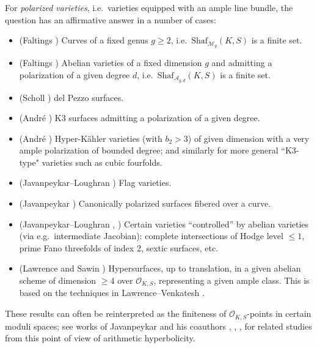\documentclass[11pt,reqno,oneside]{amsart}
\numberwithin{equation}{section}
\theoremstyle{definition}
\newcommand{\Sha}{\mathrm{Shaf}}
\begin{document}
For {\it polarized varieties}, i.e.~varieties equipped with an ample line bundle, the question has an affirmative answer in a number of cases:
\begin{itemize}
	\item (Faltings \cite{Faltings83}) Curves of a fixed genus $g\geq 2$, i.e.~$\Sha_{\mathcal{M}_g}(K,S)$ is a finite set. 
	\item (Faltings \cite{Faltings83}) Abelian varieties of a fixed dimension $g$ and admitting a polarization of a given degree $d$, i.e.~$\Sha_{\mathcal{A}_{g,d}}(K,S)$ is a finite set. 
	\item  (Scholl \cite{Sch85}) del Pezzo surfaces.
	\item (Andr\'e \cite{A96}) K3 surfaces admitting a polarization of a given degree. 
	\item (Andr\'e \cite{A96}) Hyper-Kähler varieties (with $b_2>3$) of given dimension with a very ample polarization of bounded degree; and similarly for more general ``K3-type" varieties such as cubic fourfolds. 
	\item (Javanpeykar--Loughran \cite{Javanpeykar-FlagVarieties}) Flag varieties.
	\item (Javanpeykar \cite{Javanpeykar-CanPolarizedSurface}) Canonically polarized surfaces fibered over a curve. 
	\item (Javanpeykar--Loughran \cite{JavanpeykarCI2017}, \cite{JavanpeykarLoughran-SexticSurface}) Certain varieties ``controlled'' by abelian varieties (via e.g.~intermediate Jacobian): complete intersections of Hodge level $\leq 1$, prime Fano threefolds of index 2, sextic surfaces, etc.
    \item (Lawrence and Sawin \cite{LawrenceSawin})  Hypersurfaces,  up to translation, in a given abelian scheme of dimension $\geq 4$ over $\mathcal{O}_{K,S}$, representing a given ample class. This is based on the techniques in Lawrence--Venkatesh \cite{LawrenceVenkatesh}.
\end{itemize}
These results can often be reinterpreted as the finiteness of $\mathcal{O}_{K,S}$-points in certain moduli spaces; see works of Javanpeykar and his coauthors \cite{JavanpeykarLoughran-StackyCW21}, \cite{Javanpeykar-MathAnn21}, \cite{Javanpeykar-CyclicCover}, \cite{Javanpeykar-PointedFamily} for related studies from this point of view of arithmetic hyperbolicity. 
\end{document}

